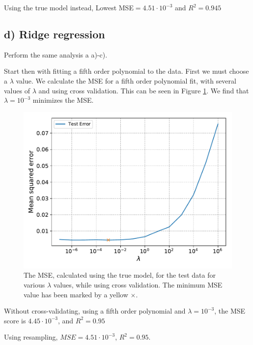 \documentclass[a4paper,10pt,english]{article}
\begin{document}
Using the true model instead, Lowest MSE$= 4.51\cdot 10^{-3}$ and $R^2= 0.945$

\subsection{d) Ridge regression}
Perform the same analysis a a)-c).

Start then with fitting a fifth order polynomial to the data. First we must choose a $\lambda$ value. We calculate the MSE for a fifth order polynomial fit, with several values of $\lambda$ and using cross validation. This can be seen in Figure \ref{fig:3}. We find that $\lambda=10^{-3}$ minimizes the MSE.

 \begin{figure}[H]
	\centering
	\includegraphics[scale=0.6]{d_lambda_vs_err_d5.pdf}
	\caption{The MSE, calculated using the true model, for the test data for various $\lambda$ values, while using cross validation. The minimum MSE value has been marked by a yellow $\times$.}
	\label{fig:3}
\end{figure}

Without cross-validating, using a fifth order polynomial and $\lambda=10^{-3}$, the MSE score is $4.45\cdot10^{-3}$, and $R^2 = 0.95$

Using resampling, $MSE= 4.51\cdot10^{-3}$, $R^2 =  0.95$.
\end{document}
